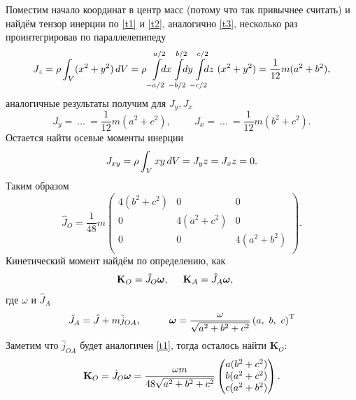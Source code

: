 Поместим начало координат в центр масс (потому что так привычнее считать) и найдём тензор инерции по \eqref{t1} и \eqref{t2}, аналогично \eqref{t3}, несколько раз проинтегрировав по параллелепипеду 
\begin{align*}
    J_z = \rho \int_V (x^2 + y^2) \d V = \rho 
    \int\limits_{-a/2}^{a/2} \hspace{-2.5 mm} d x \hspace{-1.0 mm}
    \int\limits_{-b/2}^{b/2} \hspace{-2.5 mm} d y \hspace{-1.0 mm}
    \int\limits_{-c/2}^{c/2} \hspace{-2.5 mm} d z 
    \ (x^2 + y^2) = \frac{1}{12} m (a^2 + b^2),
\end{align*}
аналогичные результаты получим для $J_y, J_x$
\begin{equation*}
    J_y = \ \ldots \ = \frac{1}{12} m (a^2 + c^2),
    \hspace{1cm} 
    J_x = \ \ldots \ = \frac{1}{12} m (b^2 + c^2).
\end{equation*}
Остается найти осевые моменты инерции
\begin{equation*}
    J_{xy} = \rho \int_V x y \, d V = 
    J_yz =
    J_xz = 0.
\end{equation*}
Таким образом
\begin{equation}
    \hat{J}_O = \frac{1}{48} m 
    \begin{pmatrix}
        4(b^2+c^2) & 0 & 0 \\
        0 & 4(a^2+c^2) & 0 \\
        0 & 0 & 4(a^2+b^2) \\
    \end{pmatrix}.
\end{equation}
Кинетический момент найдём по определению, как
\begin{equation*}
    \mathbf{K}_O = \hat{J}_O \mbox{\boldmath $\omega$}, \hspace{0.5cm} 
    \mathbf{K}_A = \hat{J}_A \mbox{\boldmath $\omega$}, \hspace{0.5cm} 
\end{equation*}
где $\omega$ и $\hat{J}_A$ 
\begin{equation*}
    \hat{J}_A = \hat{J} + m \hat{j}_{OA},
    \hspace{1cm} 
    \mbox{\boldmath $\omega$} = \frac{\omega}{\sqrt{a^2+b^2+c^2}} 
    \left(a,\ b,\ c\right)^{\text{T}}
\end{equation*}
Заметим что $\hat{j}_{OA}$ будет аналогичен \eqref{t1}, тогда осталось найти $\mathbf{K}_O$:
\begin{equation*}
    \mathbf{K}_O = \hat{J}_O \mbox{\boldmath $\omega$}= \frac{\omega m}{48\sqrt{a^2+b^2+c^2}} 
    \begin{pmatrix}
        a (b^2+c^2) \\
        b (a^2 + c^2) \\
        c (a^2 + b^2) \\
    \end{pmatrix}.
\end{equation*}


